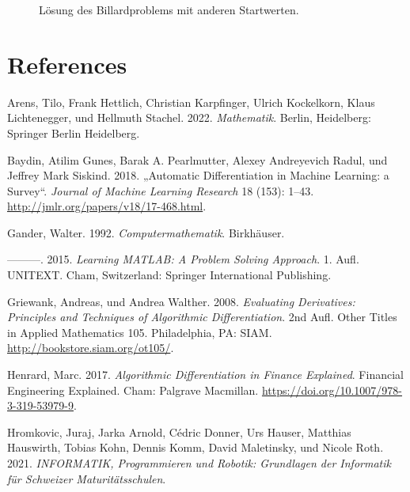 \documentclass[
  letterpaper,
  DIV=11,
  oneside]{scrreprt}
\newlength{\cslhangindent}
\newlength{\cslentryspacingunit} %
\newenvironment{CSLReferences}[2] %
 {%
  \setlength{\parindent}{0pt}
  \ifodd #1
  \let\oldpar\par
  \def\par{\hangindent=\cslhangindent\oldpar}
  \fi
  \setlength{\parskip}{#2\cslentryspacingunit}
 }%
 {}
\theoremstyle{definition}
\theoremstyle{definition}
\theoremstyle{remark}
\begin{document}
\begin{tcolorbox}
\begin{figure}[H]
{}

\caption{\label{fig-billardproblemsolutionwithmathsad}Lösung des
Billardproblems mit anderen Startwerten.}

\end{figure}

\end{tcolorbox}


\hypertarget{references}{%
\chapter*{References}\label{references}}

\hypertarget{refs}{}
\begin{CSLReferences}{1}{0}
\leavevmode{}%
Arens, Tilo, Frank Hettlich, Christian Karpfinger, Ulrich Kockelkorn,
Klaus Lichtenegger, und Hellmuth Stachel. 2022. \emph{Mathematik}.
Berlin, Heidelberg: Springer Berlin Heidelberg.

\leavevmode{}%
Baydin, Atilim Gunes, Barak A. Pearlmutter, Alexey Andreyevich Radul,
und Jeffrey Mark Siskind. 2018. {„Automatic Differentiation in Machine
Learning: a Survey``}. \emph{Journal of Machine Learning Research} 18
(153): 1--43. \url{http://jmlr.org/papers/v18/17-468.html}.

\leavevmode{}%
Gander, Walter. 1992. \emph{Computermathematik}. Birkhäuser.

\leavevmode{}%
---------. 2015. \emph{Learning {MATLAB}: A Problem Solving Approach}.
1. Aufl. UNITEXT. Cham, Switzerland: Springer International Publishing.

\leavevmode{}%
Griewank, Andreas, und Andrea Walther. 2008. \emph{Evaluating
Derivatives: {P}rinciples and Techniques of Algorithmic
Differentiation}. 2nd Aufl. Other Titles in Applied Mathematics 105.
Philadelphia, PA: SIAM. \url{http://bookstore.siam.org/ot105/}.

\leavevmode{}%
Henrard, Marc. 2017. \emph{Algorithmic Differentiation in Finance
Explained}. Financial Engineering Explained. Cham: Palgrave Macmillan.
\url{https://doi.org/10.1007/978-3-319-53979-9}.

\leavevmode{}%
Hromkovic, Juraj, Jarka Arnold, Cédric Donner, Urs Hauser, Matthias
Hauswirth, Tobias Kohn, Dennis Komm, David Maletinsky, und Nicole Roth.
2021. \emph{{INFORMATIK}, Programmieren und Robotik: Grundlagen der
Informatik f{ü}r Schweizer Maturit{ä}tsschulen}.


\end{CSLReferences}
\end{document}
